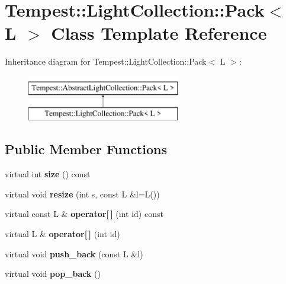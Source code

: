 \hypertarget{class_tempest_1_1_light_collection_1_1_pack}{\section{Tempest\+:\+:Light\+Collection\+:\+:Pack$<$ L $>$ Class Template Reference}
\label{class_tempest_1_1_light_collection_1_1_pack}
}
Inheritance diagram for Tempest\+:\+:Light\+Collection\+:\+:Pack$<$ L $>$\+:\begin{figure}[H]
\begin{center}
\leavevmode
\includegraphics[height=2.000000cm]{class_tempest_1_1_light_collection_1_1_pack}
\end{center}
\end{figure}
\subsection*{Public Member Functions}
\begin{DoxyCompactItemize}
\item 
\hypertarget{class_tempest_1_1_light_collection_1_1_pack_aa3042dc323578fb59ccd4f37b241022d}{virtual int {\bfseries size} () const }\label{class_tempest_1_1_light_collection_1_1_pack_aa3042dc323578fb59ccd4f37b241022d}

\item 
\hypertarget{class_tempest_1_1_light_collection_1_1_pack_a06bd877660d2a178198c8306393fbf44}{virtual void {\bfseries resize} (int s, const L \&l=L())}\label{class_tempest_1_1_light_collection_1_1_pack_a06bd877660d2a178198c8306393fbf44}

\item 
\hypertarget{class_tempest_1_1_light_collection_1_1_pack_ad5122b4fa57e28897b5a8c13e7ec2401}{virtual const L \& {\bfseries operator\mbox{[}$\,$\mbox{]}} (int id) const }\label{class_tempest_1_1_light_collection_1_1_pack_ad5122b4fa57e28897b5a8c13e7ec2401}

\item 
\hypertarget{class_tempest_1_1_light_collection_1_1_pack_a90947a4c64b5861b4e9b188c887a0819}{virtual L \& {\bfseries operator\mbox{[}$\,$\mbox{]}} (int id)}\label{class_tempest_1_1_light_collection_1_1_pack_a90947a4c64b5861b4e9b188c887a0819}

\item 
\hypertarget{class_tempest_1_1_light_collection_1_1_pack_a99e1f88cc710d9fdb80c29820c3445c1}{virtual void {\bfseries push\+\_\+back} (const L \&l)}\label{class_tempest_1_1_light_collection_1_1_pack_a99e1f88cc710d9fdb80c29820c3445c1}

\item 
\hypertarget{class_tempest_1_1_light_collection_1_1_pack_ac85227c540d519159ce3f697dbfc436b}{virtual void {\bfseries pop\+\_\+back} ()}\label{class_tempest_1_1_light_collection_1_1_pack_ac85227c540d519159ce3f697dbfc436b}

\end{DoxyCompactItemize}
